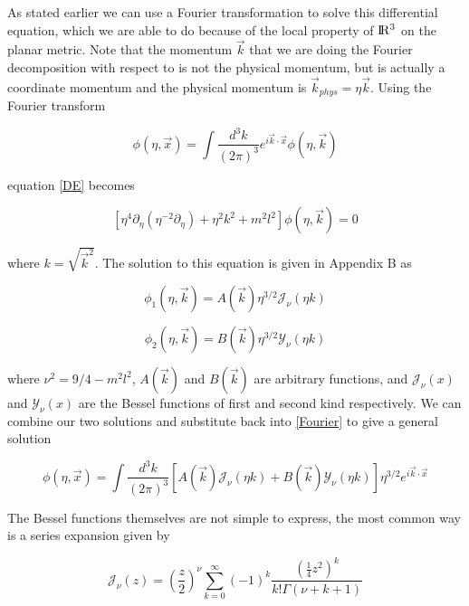 \documentclass[a4paper,11pt]{article}
\numberwithin{equation}{section}
\numberwithin{figure}{section}
\begin{document}
\begin{large}
As stated earlier we can use a Fourier transformation to solve this differential equation, which we are able to do because of the local property of $\rm I\!R^3$ on the planar metric.
Note that the momentum $\Vec{k}$ that we are doing the Fourier decomposition with respect to is not the physical momentum, but is actually a coordinate momentum and the physical momentum is $\Vec{k}_{phys}=\eta\Vec{k}$.
Using the Fourier transform

\begin{equation}
\label{Fourier}    
    \phi(\eta,\Vec{x})=\int \frac{d^3k}{(2\pi)^3}e^{i\Vec{k}\cdot\Vec{x}}\phi(\eta,\Vec{k})
\end{equation}


 equation \eqref{DE} becomes

\begin{equation}
\label{DEFT}    
    [\eta^4\partial_\eta(\eta^{-2}\partial_\eta)+\eta^2k^2+m^2l^2]\phi(\eta,\Vec{k})=0
\end{equation}

where $k=\sqrt{\Vec{k}^2}$. The solution to this equation is given in Appendix B as

\begin{equation}
\label{phi1}    
    \phi_1(\eta,\Vec{k})=A(\Vec{k})\eta^{3/2}\mathcal{J}_\nu (\eta k)
\end{equation}

\begin{equation}
\label{phi2}
    \phi_2(\eta,\Vec{k})=B(\Vec{k})\eta^{3/2}\mathcal{Y}_\nu (\eta k)
\end{equation}

where $\nu^2=9/4-m^2l^2$, $A(\Vec{k})$ and $B(\Vec{k})$ are arbitrary functions, and $\mathcal{J}_\nu(x)$ and $\mathcal{Y}_\nu(x)$ are the Bessel functions of first and second kind respectively. We can combine our two solutions and substitute back into \eqref{Fourier} to give a general solution  

\begin{equation}
\label{genKGsol}    
    \phi(\eta,\Vec{x})= \int \frac{d^3k}{(2\pi)^3}\left[A(\Vec{k})\mathcal{J}_\nu (\eta k)+ B(\Vec{k})\mathcal{Y}_\nu (\eta k) \right]\eta^{3/2}e^{i \Vec{k}\cdot\Vec{x}}
\end{equation}

\newpage

The Bessel functions themselves are not simple to express, the most common way is a series expansion given by

\begin{equation}
\label{J(z)}    
    \mathcal{J}_\nu(z)=\left(\frac{z}{2}\right)^\nu \sum\limits_{k=0}^\infty (-1)^k \frac{(\frac{1}{4}z^2)^k}{k! \Gamma (\nu+k+1)}
\end{equation}


\end{large}
\end{document}
